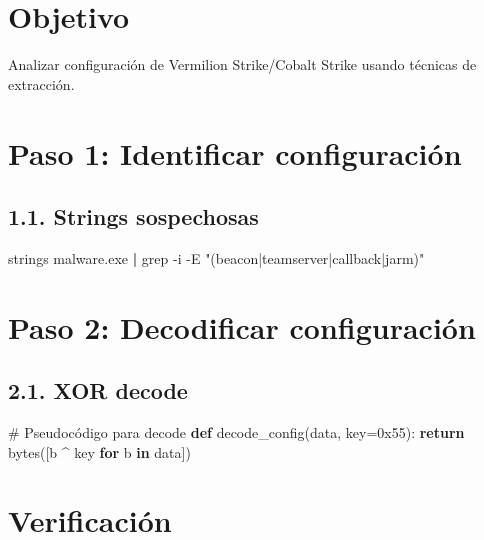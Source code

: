 \documentclass[
  letterpaper,
]{report}
\newenvironment{Shaded}{\begin{snugshade}}{\end{snugshade}}
\newcommand{\AttributeTok}[1]{\textcolor[rgb]{0.40,0.45,0.13}{#1}}
\newcommand{\BaseNTok}[1]{\textcolor[rgb]{0.68,0.00,0.00}{#1}}
\newcommand{\BuiltInTok}[1]{\textcolor[rgb]{0.00,0.23,0.31}{#1}}
\newcommand{\CommentTok}[1]{\textcolor[rgb]{0.37,0.37,0.37}{#1}}
\newcommand{\ControlFlowTok}[1]{\textcolor[rgb]{0.00,0.23,0.31}{\textbf{#1}}}
\newcommand{\FunctionTok}[1]{\textcolor[rgb]{0.28,0.35,0.67}{#1}}
\newcommand{\KeywordTok}[1]{\textcolor[rgb]{0.00,0.23,0.31}{\textbf{#1}}}
\newcommand{\NormalTok}[1]{\textcolor[rgb]{0.00,0.23,0.31}{#1}}
\newcommand{\OperatorTok}[1]{\textcolor[rgb]{0.37,0.37,0.37}{#1}}
\newcommand{\StringTok}[1]{\textcolor[rgb]{0.13,0.47,0.30}{#1}}
\begin{document}
\section{Objetivo}\label{objetivo-7}

Analizar configuración de Vermilion Strike/Cobalt Strike usando técnicas
de extracción.

\section{Paso 1: Identificar
configuración}\label{paso-1-identificar-configuraciuxf3n}

\subsection{1.1. Strings sospechosas}\label{strings-sospechosas}

\begin{Shaded}
\begin{Highlighting}[]
\FunctionTok{strings}\NormalTok{ malware.exe }\KeywordTok{|} \FunctionTok{grep} \AttributeTok{{-}i} \AttributeTok{{-}E} \StringTok{"(beacon|teamserver|callback|jarm)"}
\end{Highlighting}
\end{Shaded}

\section{Paso 2: Decodificar
configuración}\label{paso-2-decodificar-configuraciuxf3n}

\subsection{2.1. XOR decode}\label{xor-decode}

\begin{Shaded}
\begin{Highlighting}[]
\CommentTok{\# Pseudocódigo para decode}
\KeywordTok{def}\NormalTok{ decode\_config(data, key}\OperatorTok{=}\BaseNTok{0x55}\NormalTok{):}
    \ControlFlowTok{return} \BuiltInTok{bytes}\NormalTok{([b }\OperatorTok{\^{}}\NormalTok{ key }\ControlFlowTok{for}\NormalTok{ b }\KeywordTok{in}\NormalTok{ data])}
\end{Highlighting}
\end{Shaded}

\section{Verificación}\label{verificaciuxf3n-6}
\end{document}
